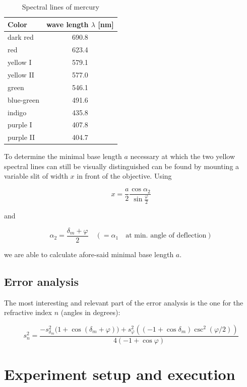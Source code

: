 \documentclass{scrreprt}
\renewcommand{\phi}{\varphi}
\begin{document}
\begin{table}[H]
\centering
\begin{tabular}{|l|c|}
\hline
Color & wave length $\lambda$ [nm]\\
\hline\hline
dark red & 690.8\\
red & 623.4 \\
yellow I & 579.1\\
yellow II & 577.0\\
green & 546.1\\
blue-green & 491.6\\
indigo & 435.8\\
purple I & 407.8\\
purple II & 404.7\\\hline
\end{tabular}
\caption{Spectral lines of mercury}
\label{tab:spectral_lines}
\end{table}

To determine the minimal base length $a$ necessary at which the two yellow spectral lines can still be visually distinguished can be found by mounting a variable slit of width $x$ in front of the objective. Using 

\begin{equation}\label{eq:slit}
x = \frac{a}{2} \frac{\cos{\alpha_2}}{\sin{\frac{\phi}{2}}}
\end{equation}

and

\begin{equation}
\alpha_2 = \frac{\delta_m + \phi}{2} \quad ( = \alpha_1 \quad \text{at min. angle of deflection})
\end{equation}

we are able to calculate afore-said minimal base length $a$. 

\subsection{Error analysis}
The most interesting and relevant part of the error analysis is the one for the refractive index $n$ (angles in degrees):

\begin{equation}
s_n^2 = \frac{-s_{\delta_m}^2 (1+\cos{(\delta_m + \phi))} + s_{\phi}^2 ((-1+\cos \delta_m) \csc^2(\phi / 2))}{4 (-1 + \cos \phi)}
\end{equation}


\section{Experiment setup and execution}
\end{document}
